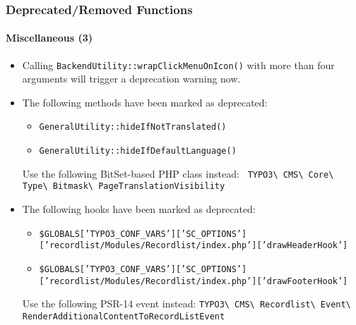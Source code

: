 %

\begin{frame}[fragile]
	\frametitle{Deprecated/Removed Functions}
	\framesubtitle{Miscellaneous (3)}

	\begin{itemize}
		\item Calling \texttt{BackendUtility::wrapClickMenuOnIcon()} with more
			than four arguments will trigger a deprecation warning now.
		\item The following methods have been marked as deprecated:
			\begin{itemize}
				\item \texttt{GeneralUtility::hideIfNotTranslated()}
				\item \texttt{GeneralUtility::hideIfDefaultLanguage()}
			\end{itemize}
			\small
				Use the following BitSet-based PHP class instead:\newline
				\smaller\texttt{
					TYPO3\textbackslash
					CMS\textbackslash
					Core\textbackslash
					Type\textbackslash
					Bitmask\textbackslash
					PageTranslationVisibility}
			\normalsize

		\item The following hooks have been marked as deprecated:
			\begin{itemize}\smaller
				\item \texttt{\$GLOBALS['TYPO3\_CONF\_VARS']['SC\_OPTIONS']['recordlist/Modules/Recordlist/index.php']['drawHeaderHook']}
				\item \texttt{\$GLOBALS['TYPO3\_CONF\_VARS']['SC\_OPTIONS']['recordlist/Modules/Recordlist/index.php']['drawFooterHook']}
			\end{itemize}\normalsize
			\small
				Use the following PSR-14 event instead:\newline
				\smaller\texttt{TYPO3\textbackslash
					CMS\textbackslash
					Recordlist\textbackslash
					Event\textbackslash
					RenderAdditionalContentToRecordListEvent}
			\normalsize

	\end{itemize}

\end{frame}

